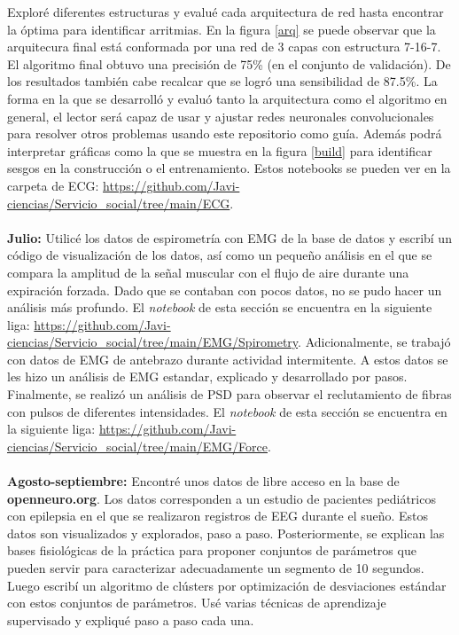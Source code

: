 \documentclass[11pt,letterpaper]{article}
\begin{document}
\begin{justify}
Exploré diferentes estructuras y evalué cada arquitectura de red hasta encontrar la óptima para identificar arritmias. En la figura \ref{arq} se puede observar que la arquitecura final está conformada por una red de 3 capas con estructura 7-16-7. El algoritmo final obtuvo una precisión de 75\% (en el conjunto de validación). De los resultados también cabe recalcar que se logró una sensibilidad de 87.5\%. La forma en la que se desarrolló y evaluó tanto la arquitectura como el algoritmo en general, el lector será capaz de usar y ajustar redes neuronales convolucionales para resolver otros problemas usando este repositorio como guía. Además podrá interpretar gráficas como la que se muestra en la figura \ref{build} para identificar sesgos en la construcción o el entrenamiento. Estos notebooks se pueden ver en la carpeta de ECG: \href{https://github.com/Javi-ciencias/Servicio\_social/tree/main/ECG}{https://github.com/Javi-ciencias/Servicio\_social/tree/main/ECG}.\\
\hfill \\
\textbf{Julio:}  Utilicé los datos de espirometría con EMG de la base de datos y escribí un código de visualización de los datos, así como un pequeño análisis en el que se compara la amplitud de la señal muscular con el flujo de aire durante una expiración forzada. Dado que se contaban con pocos datos, no se pudo hacer un análisis más profundo. El \textit{notebook} de esta sección se encuentra en la siguiente liga: \href{https://github.com/Javi-ciencias/Servicio\_social/tree/main/EMG/Spirometry}{https://github.com/Javi-ciencias/Servicio\_social/tree/main/EMG/Spirometry}. Adicionalmente, se trabajó con datos de EMG de antebrazo durante actividad intermitente. A estos datos se les hizo un análisis de EMG estandar, explicado y desarrollado por pasos. Finalmente, se realizó un análisis de PSD para observar el reclutamiento de fibras con pulsos de diferentes intensidades. El \textit{notebook} de esta sección se encuentra en la siguiente liga: \href{https://github.com/Javi-ciencias/Servicio\_social/tree/main/EMG/Force}{https://github.com/Javi-ciencias/Servicio\_social/tree/main/EMG/Force}. \\
\hfill \\
\textbf{Agosto-septiembre:} Encontré unos datos de libre acceso en la base de \textbf{openneuro.org}. Los datos corresponden a un estudio de pacientes pediátricos con epilepsia en el que se realizaron registros de EEG durante el sueño. Estos datos son visualizados y explorados, paso a paso. Posteriormente, se explican las bases fisiológicas de la práctica para proponer conjuntos de parámetros que pueden servir para caracterizar adecuadamente un segmento de 10 segundos. Luego escribí un algoritmo de clústers por optimización de desviaciones estándar con estos conjuntos de parámetros. Usé varias técnicas de aprendizaje supervisado y expliqué paso a paso cada una. \\

\end{justify}
\end{document}

